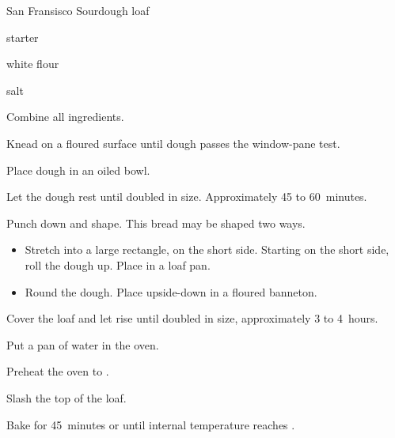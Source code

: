 \begin{recipe}{San Fransisco Sourdough}{}{\kgr{\half} loaf}

\begin{ingredients}
\item \C{1\threequarter} starter
\item {} white flour
\item {} salt
\end{ingredients}

\begin{directions}
\item Combine all ingredients.
\item Knead on a floured surface until dough passes the window-pane test.
\item Place dough in an oiled bowl.
\item Let the dough rest until doubled in size. Approximately 45 to 60~minutes.
\item Punch down and shape.
This bread may be shaped two ways.
\begin{itemize}
\item Stretch into a large rectangle,  on the short side. Starting on the short side, roll the dough up. Place in a loaf pan.
\item Round the dough. Place upside-down in a floured banneton.
\end{itemize}
\item Cover the loaf and let rise until doubled in size, approximately 3 to 4~hours.
\item Put a pan of water in the oven.
\item Preheat the oven to .
\item Slash the top of the loaf.
\item Bake for 45~minutes or until internal temperature reaches .
\end{directions}
\end{recipe}
